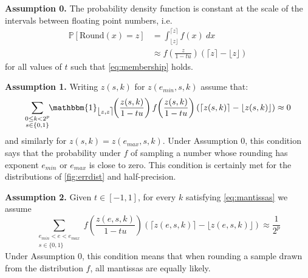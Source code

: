 \documentclass[10pt,conference]{IEEEtran}
\newcommand{\ie}{i.e.\ }
\newcommand{\Pro}[1]{\mathbb{P}\left[ #1 \right]}
\newcommand{\round}{\mathrm{Round}}
\newcommand{\ceil}[1]{\lceil #1 \rceil}
\newcommand{\floor}[1]{\lfloor #1 \rfloor}
\newcommand{\fintvl}[1][x]{\mathlarger{\lfloor}#1,#1\mathlarger{\rceil}}
\newcommand{\one}{\mathbbm{1}}
\begin{document}
\noindent \textbf{Assumption 0.} The probability density function is constant at the scale of the intervals between floating point numbers, \ie
\begin{align*}
\Pro{\round(x)=z}
&=\int_{\floor{z}}^{\ceil{z}} f(x)~dx 
\\
&\approx f\left(\frac{z}{1-tu}\right)(\ceil{z}-\floor{z})
\end{align*}
for all values of $t$ such that \cref{eq:membership} holds.

\noindent  \textbf{Assumption 1.} Writing $z(s,k)$ for $z(e_{min},s,k)$ assume that:
\[
\sum_{\substack{0\leq k<2^p\\ s\in\{0,1\}}}\hspace{-3pt}\one_{\fintvl[z]}\hspace{-3pt}\left(\frac{z(s,k)}{1-tu}\right)f\hspace{-2pt}\left(\frac{z(s,k)}{1-tu}\right)(\ceil{z(s,k)}-\floor{z(s,k)})\approx 0
\]
and similarly for $z(s,k)=z(e_{max},s,k)$.
Under Assumption 0, this condition says that the probability under $f$ of sampling a number whose rounding has exponent $e_{min}$ or $e_{max}$ is close to zero. This condition is certainly met for the distributions of \cref{fig:errdist} and half-precision.

\noindent \textbf{Assumption 2.} Given $t\in\left[-1,1\right]$, for every $k$ satisfying \cref{eq:mantissas} we assume
\[
\sum_{\substack{e_{min}<e<e_{max}\\ s\in\{0,1\}}}f\left(\frac{z(e,s,k)}{1-tu}\right)(\ceil{z(e,s,k)}-\floor{z(e,s,k)})\approx \frac{1}{2^p}
\]
Under Assumption 0, this condition means that when rounding a sample drawn from the distribution $f$, all mantissas are equally likely.
\end{document}
